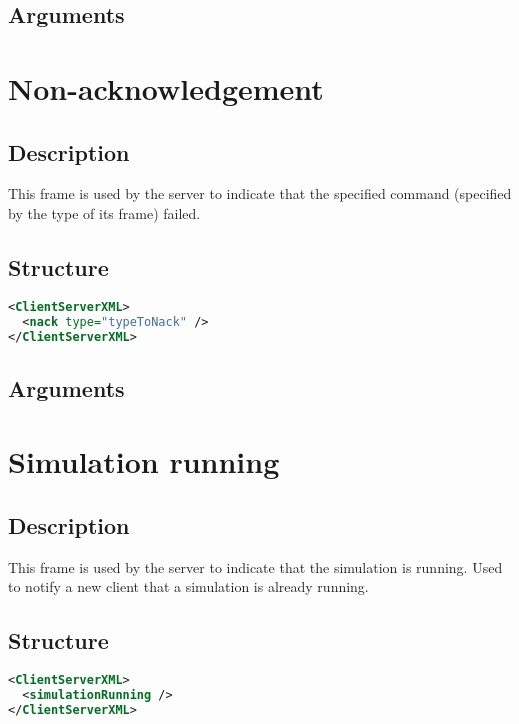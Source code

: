 \subsection{Arguments}


\section{Non-acknowledgement}
\label{nack}

\subsection{Description}

This frame is used by the server to indicate that the specified command
(specified by the type of its frame) failed.

\subsection{Structure}

\begin{lstlisting}[language=XML]
<ClientServerXML>
  <nack type="typeToNack" />
</ClientServerXML>
\end{lstlisting}

\subsection{Arguments}


\section{Simulation running}
\label{simulationRunning}

\subsection{Description}

This frame is used by the server to indicate that the simulation is running.
Used to notify a new client that a simulation is already running.

\subsection{Structure}

\begin{lstlisting}[language=XML]
<ClientServerXML>
  <simulationRunning />
</ClientServerXML>
\end{lstlisting}